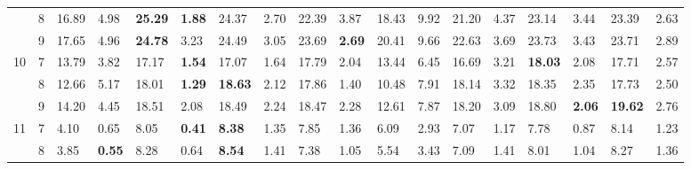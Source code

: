 \documentclass[conference]{IEEEtran}
\begin{document}
\begin{table}[]
\begin{tabular}{|cl|ll|ll|ll|ll|ll|ll|ll|ll|}
		\multicolumn{1}{|c|}{} & 8 & \multicolumn{1}{l|}{16.89} & 4.98 & \multicolumn{1}{l|}{\textbf{25.29}} & \textbf{1.88} & \multicolumn{1}{l|}{24.37} & 2.70 & \multicolumn{1}{l|}{22.39} & 3.87 & \multicolumn{1}{l|}{18.43} & 9.92 & \multicolumn{1}{l|}{21.20} & 4.37 & \multicolumn{1}{l|}{23.14} & 3.44 & \multicolumn{1}{l|}{23.39} & 2.63 \\ \cline{2-18} 
		\multicolumn{1}{|c|}{} & 9 & \multicolumn{1}{l|}{17.65} & 4.96 & \multicolumn{1}{l|}{\textbf{24.78}} & 3.23 & \multicolumn{1}{l|}{24.49} & 3.05 & \multicolumn{1}{l|}{23.69} & \textbf{2.69} & \multicolumn{1}{l|}{20.41} & 9.66 & \multicolumn{1}{l|}{22.63} & 3.69 & \multicolumn{1}{l|}{23.73} & 3.43 & \multicolumn{1}{l|}{23.71} & 2.89 \\ \hline
		\multicolumn{1}{|c|}{\multirow{3}{*}{10}} & 7 & \multicolumn{1}{l|}{13.79} & 3.82 & \multicolumn{1}{l|}{17.17} & \textbf{1.54} & \multicolumn{1}{l|}{17.07} & 1.64 & \multicolumn{1}{l|}{17.79} & 2.04 & \multicolumn{1}{l|}{13.44} & 6.45 & \multicolumn{1}{l|}{16.69} & 3.21 & \multicolumn{1}{l|}{\textbf{18.03}} & 2.08 & \multicolumn{1}{l|}{17.71} & 2.57 \\ \cline{2-18} 
		\multicolumn{1}{|c|}{} & 8 & \multicolumn{1}{l|}{12.66} & 5.17 & \multicolumn{1}{l|}{18.01} & \textbf{1.29} & \multicolumn{1}{l|}{\textbf{18.63}} & 2.12 & \multicolumn{1}{l|}{17.86} & 1.40 & \multicolumn{1}{l|}{10.48} & 7.91 & \multicolumn{1}{l|}{18.14} & 3.32 & \multicolumn{1}{l|}{18.35} & 2.35 & \multicolumn{1}{l|}{17.73} & 2.50 \\ \cline{2-18} 
		\multicolumn{1}{|c|}{} & 9 & \multicolumn{1}{l|}{14.20} & 4.45 & \multicolumn{1}{l|}{18.51} & 2.08 & \multicolumn{1}{l|}{18.49} & 2.24 & \multicolumn{1}{l|}{18.47} & 2.28 & \multicolumn{1}{l|}{12.61} & 7.87 & \multicolumn{1}{l|}{18.20} & 3.09 & \multicolumn{1}{l|}{18.80} & \textbf{2.06} & \multicolumn{1}{l|}{\textbf{19.62}} & 2.76 \\ \hline
		\multicolumn{1}{|c|}{\multirow{3}{*}{11}} & 7 & \multicolumn{1}{l|}{4.10} & 0.65 & \multicolumn{1}{l|}{8.05} & \textbf{0.41} & \multicolumn{1}{l|}{\textbf{8.38}} & 1.35 & \multicolumn{1}{l|}{7.85} & 1.36 & \multicolumn{1}{l|}{6.09} & 2.93 & \multicolumn{1}{l|}{7.07} & 1.17 & \multicolumn{1}{l|}{7.78} & 0.87 & \multicolumn{1}{l|}{8.14} & 1.23 \\ \cline{2-18} 
		\multicolumn{1}{|c|}{} & 8 & \multicolumn{1}{l|}{3.85} & \textbf{0.55} & \multicolumn{1}{l|}{8.28} & 0.64 & \multicolumn{1}{l|}{\textbf{8.54}} & 1.41 & \multicolumn{1}{l|}{7.38} & 1.05 & \multicolumn{1}{l|}{5.54} & 3.43 & \multicolumn{1}{l|}{7.09} & 1.41 & \multicolumn{1}{l|}{8.01} & 1.04 & \multicolumn{1}{l|}{8.27} & 1.36 \\ \cline{2-18} 

\end{tabular}
\end{table}
\end{document}
